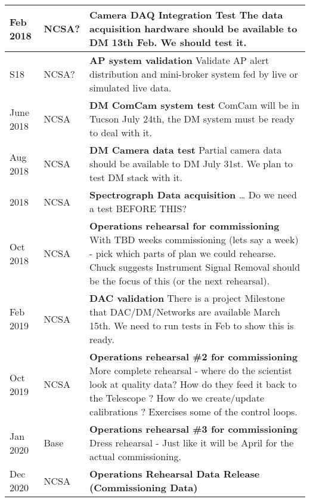 \begin{longtable} {|l|l|p{}|}
Feb 2018 & NCSA? &  {\bf Camera DAQ Integration Test }\newline
The data acquisition hardware should be available to DM 13th Feb. We should test it.
\\ \hline

S18 & NCSA? &  {\bf AP system validation}\newline
Validate AP alert distribution and mini-broker system fed by live or simulated live data. 
\\ \hline

June 2018 & NCSA &  {\bf DM ComCam system test }\newline
ComCam will be in Tucson July 24th, the DM system must be ready to deal with it. 
\\ \hline

Aug 2018 & NCSA &  {\bf DM Camera data test }\newline
Partial camera data should be available to DM July 31st. We plan to test DM stack with it. 
\\ \hline

2018 & NCSA & {\bf Spectrograph Data acquisition } \newline
\ldots  {\color{red} Do we need a test BEFORE THIS?}
\\ \hline

Oct 2018 &  NCSA & {\bf Operations rehearsal for commissioning }
With TBD weeks commissioning (lets say a week) - pick which parts of plan we could rehearse.
Chuck suggests Instrument Signal Removal should be the focus of this (or the next rehearsal).
\\ \hline

Feb 2019 & NCSA &  {\bf DAC validation  }\newline
There is a project Milestone that DAC/DM/Networks are  available March 15th. We need to run tests in Feb to show this is ready.
\\ \hline

Oct 2019 & NCSA &  {\bf  Operations rehearsal \#2 for commissioning} 
More complete rehearsal - where do the scientist look at quality data? How do they feed it back to the Telescope ?
How do we create/update calibrations ? Exercises some of the control loops.
\\ \hline

Jan 2020 & Base  &  {\bf  Operations rehearsal \#3 for commissioning} 
Dress rehearsal - Just like it will be April for the actual commissioning.
\\ \hline

Dec 2020 &  NCSA &  {\bf Operations  Rehearsal Data Release (Commissioning Data)}
\\ \hline


\end{longtable}
